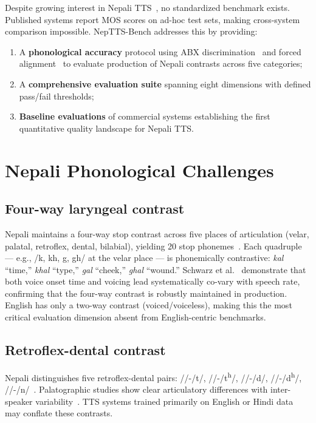 \documentclass{Interspeech}
\begin{document}
Despite growing interest in Nepali TTS~\cite{Khadka2023, Dongol2023, Regmi2024, NepaliVoiceCloning2025}, no standardized benchmark exists. Published systems report MOS scores on ad-hoc test sets, making cross-system comparison impossible. NepTTS-Bench addresses this by providing:

\begin{enumerate}
  \item A \textbf{phonological accuracy} protocol using ABX discrimination~\cite{Schatz2013, Schatz2016} and forced alignment~\cite{McAuliffe2017} to evaluate production of Nepali contrasts across five categories;
  \item A \textbf{comprehensive evaluation suite} spanning eight dimensions with defined pass/fail thresholds;
  \item \textbf{Baseline evaluations} of commercial systems establishing the first quantitative quality landscape for Nepali TTS.
\end{enumerate}


\section{Nepali Phonological Challenges}

\subsection{Four-way laryngeal contrast}

Nepali maintains a four-way stop contrast across five places of articulation (velar, palatal, retroflex, dental, bilabial), yielding 20 stop phonemes~\cite{Khatiwada2009}. Each quadruple --- e.g., /k, kh, g, gh/ at the velar place --- is phonemically contrastive: \textit{kal} ``time,'' \textit{khal} ``type,'' \textit{gal} ``cheek,'' \textit{ghal} ``wound.'' Schwarz et al.~\cite{Schwarz2019} demonstrate that both voice onset time and voicing lead systematically co-vary with speech rate, confirming that the four-way contrast is robustly maintained in production. English has only a two-way contrast (voiced/voiceless), making this the most critical evaluation dimension absent from English-centric benchmarks.

\subsection{Retroflex-dental contrast}

Nepali distinguishes five retroflex-dental pairs: //-/t/, //-/t\textsuperscript{h}/, //-/d/, //-/d\textsuperscript{h}/, //-/n/~\cite{Khatiwada2007retroflex}. Palatographic studies show clear articulatory differences with inter-speaker variability~\cite{Khatiwada2007retroflex, Hamann2003}. TTS systems trained primarily on English or Hindi data may conflate these contrasts.
\end{document}
